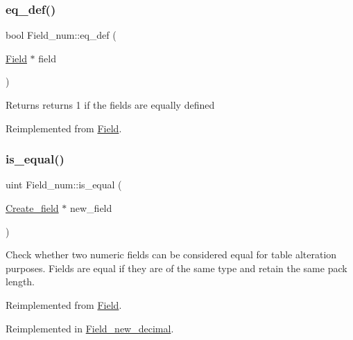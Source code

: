 \subsubsection{\texorpdfstring{eq\+\_\+def()}{eq\_def()}}
{\footnotesize\ttfamily bool Field\+\_\+num\+::eq\+\_\+def (\begin{DoxyParamCaption}\item[{\mbox{\hyperlink{classField}{Field}} $\ast$}]{field }\end{DoxyParamCaption})\hspace{0.3cm}{\ttfamily [virtual]}}

\begin{DoxyReturn}{Returns}
returns 1 if the fields are equally defined 
\end{DoxyReturn}


Reimplemented from \mbox{\hyperlink{classField_a7c9a51f0cc4e8c580838eed3a4f8e846}{Field}}.

\mbox{\label{classField__num_af9c9a23de2d14eceaeb96f1f98212ed4}} 
\subsubsection{\texorpdfstring{is\+\_\+equal()}{is\_equal()}}
{\footnotesize\ttfamily uint Field\+\_\+num\+::is\+\_\+equal (\begin{DoxyParamCaption}\item[{\mbox{\hyperlink{classCreate__field}{Create\+\_\+field}} $\ast$}]{new\+\_\+field }\end{DoxyParamCaption})\hspace{0.3cm}{\ttfamily [virtual]}}

Check whether two numeric fields can be considered \textquotesingle{}equal\textquotesingle{} for table alteration purposes. Fields are equal if they are of the same type and retain the same pack length. 

Reimplemented from \mbox{\hyperlink{classField_a8c99e9c66c1d578a339ae87d128843b7}{Field}}.



Reimplemented in \mbox{\hyperlink{classField__new__decimal_a322bc9ecdcf1ffab0787b933fac016d9}{Field\+\_\+new\+\_\+decimal}}.

\mbox{\label{classField__num_a66573c9ffc227799320c49a73a0f8de5}} 
